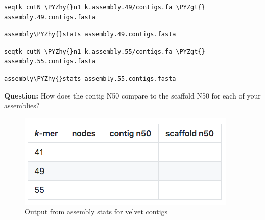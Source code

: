 \documentclass[11pt]{article}
\makeatletter
\def\PYZgt{\char`\>}
\def\PYZhy{\char`\-}
\newcommand{\boxspacing}{\kern\kvtcb@left@rule\kern\kvtcb@boxsep}
\newcommand{\prompt}[4]{
        {\ttfamily\llap{{\color{#2}[#3]:\hspace{3pt}#4}}\vspace{-\baselineskip}}
    }
\makeatother
\begin{document}
    \begin{tcolorbox}[breakable, size=fbox, boxrule=1pt, pad at break*=1mm,colback=cellbackground, colframe=cellborder]
\prompt{In}{incolor}{ }{\boxspacing}
\begin{Verbatim}[commandchars=\\\{\}]
seqtk cutN \PYZhy{}n1 k.assembly.49/contigs.fa \PYZgt{} assembly.49.contigs.fasta
\end{Verbatim}
\end{tcolorbox}

    \begin{tcolorbox}[breakable, size=fbox, boxrule=1pt, pad at break*=1mm,colback=cellbackground, colframe=cellborder]
\prompt{In}{incolor}{ }{\boxspacing}
\begin{Verbatim}[commandchars=\\\{\}]
assembly\PYZhy{}stats assembly.49.contigs.fasta
\end{Verbatim}
\end{tcolorbox}

    \begin{tcolorbox}[breakable, size=fbox, boxrule=1pt, pad at break*=1mm,colback=cellbackground, colframe=cellborder]
\prompt{In}{incolor}{ }{\boxspacing}
\begin{Verbatim}[commandchars=\\\{\}]
seqtk cutN \PYZhy{}n1 k.assembly.55/contigs.fa \PYZgt{} assembly.55.contigs.fasta
\end{Verbatim}
\end{tcolorbox}

    \begin{tcolorbox}[breakable, size=fbox, boxrule=1pt, pad at break*=1mm,colback=cellbackground, colframe=cellborder]
\prompt{In}{incolor}{ }{\boxspacing}
\begin{Verbatim}[commandchars=\\\{\}]
assembly\PYZhy{}stats assembly.55.contigs.fasta
\end{Verbatim}
\end{tcolorbox}

    \textbf{Question:} How does the contig N50 compare to the scaffold N50
for each of your assemblies?

    \begin{figure}
\centering
\includegraphics{images/n50_comparisons.png}
\caption{Output from assembly stats for velvet contigs}
\end{figure}
\end{document}
